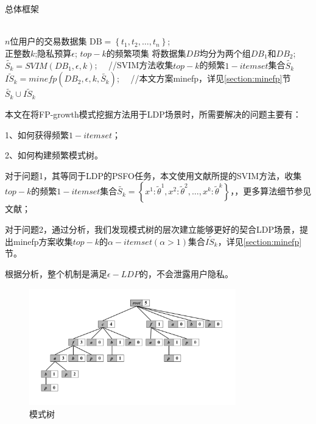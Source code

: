 \documentclass[UTF8]{ctexart}
\begin{document}
\begin{algorithm}[htbp]
    \caption{总体框架}
    \label{alg:fullstep}
        \begin{algorithmic}[1]
        \REQUIRE ~~\\
        $n$位用户的交易数据集 $\mathrm{DB}=\left\{t_{1}, t_{2}, \ldots, t_{n}\right\}$;\\
        正整数$k$;隐私预算$\epsilon$;
        \ENSURE $top-k$的频繁项集
        \STATE 将数据集$DB$均分为两个组$D B_{1}$和$D B_{2}$;
        \label{fullstep:group}
			 \STATE $\tilde{S_k} = SVIM(DB_1,\epsilon,k)$; \ \  //SVIM\cite{wang2018locally}方法收集$top-k$的频繁$1-itemset$集合$\tilde{S_k}$
        \label{fullstep:SVIM}
			 \STATE $\tilde{IS_k} = minefp(DB_2,\epsilon,k,\tilde{S_k})$; \ \  //本文方案minefp，详见\ref{section:minefp}节
			 \label{fullstep:minefp}
        \RETURN $\tilde{S_k} \cup \tilde{IS_k}$
        \end{algorithmic}
\end{algorithm}

本文在将FP-growth模式挖掘方法用于LDP场景时，所需要解决的问题主要有：

1、如何获得频繁$1-itemset$；

2、如何构建频繁模式树。

对于问题1，其等同于LDP的PSFO任务，本文使用文献\cite{wang2018locally}所提的SVIM方法，收集$top-k$的频繁$1-itemset$集合$\tilde{S_k}=\left\{x^{1}: \tilde{\theta}^{1}, x^{2}: \tilde{\theta}^{2}, \ldots, x^{k}: \tilde{\theta}^{k}\right\}$，，更多算法细节参见文献；

对于问题2，通过分析，我们发现模式树的层次建立能够更好的契合LDP场景，提出minefp方案收集$top-k$的$\alpha -itemset(\alpha>1)$集合$\tilde{IS_k}$，详见\ref{section:minefp}节。

根据分析，整个机制是满足$\epsilon-LDP$的，不会泄露用户隐私。

  \begin{figure}[h]
    \centering
    \includegraphics[width=0.8\textwidth]{123.pdf}
    \caption{模式树}
    \label{fig:fptree}
  \end{figure}
\end{document}
